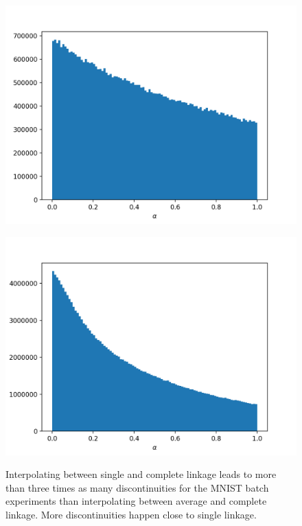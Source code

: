 \begin{figure}[h]
\begin{minipage}{.45\textwidth}
  \centering
  {\includegraphics[width=\linewidth]{plots/mnist_ac_split_counts}}
\end{minipage}\quad
\begin{minipage}{.45\textwidth}
  \centering
  {\includegraphics[width=\linewidth]{plots/mnist_sc_split_counts}}
\end{minipage}
\caption{Interpolating between single and complete linkage leads to more than three times as many discontinuities for the MNIST batch experiments than interpolating between average and complete linkage. More discontinuities happen close to single linkage.}
\label{fig:splits}
\end{figure}

